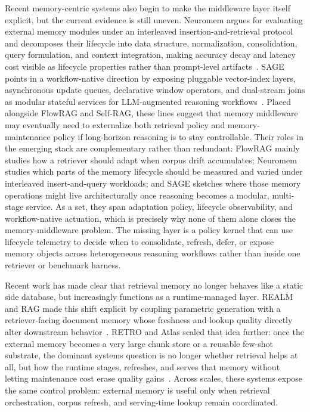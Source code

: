 \documentclass[acmsmall,screen,review]{acmart}
\begin{document}
Recent memory-centric systems also begin to make the middleware layer itself explicit, but the current evidence is still uneven. Neuromem argues for evaluating external memory modules under an interleaved insertion-and-retrieval protocol and decomposes their lifecycle into data structure, normalization, consolidation, query formulation, and context integration, making accuracy decay and latency cost visible as lifecycle properties rather than prompt-level artifacts~\cite{zhang2026neuromem}. SAGE points in a workflow-native direction by exposing pluggable vector-index layers, asynchronous update queues, declarative window operators, and dual-stream joins as modular stateful services for LLM-augmented reasoning workflows~\cite{liu2026sage}. Placed alongside FlowRAG and Self-RAG, these lines suggest that memory middleware may eventually need to externalize both retrieval policy and memory-maintenance policy if long-horizon reasoning is to stay controllable. Their roles in the emerging stack are complementary rather than redundant: FlowRAG mainly studies how a retriever should adapt when corpus drift accumulates; Neuromem studies which parts of the memory lifecycle should be measured and varied under interleaved insert-and-query workloads; and SAGE sketches where those memory operations might live architecturally once reasoning becomes a modular, multi-stage service. As a set, they span adaptation policy, lifecycle observability, and workflow-native actuation, which is precisely why none of them alone closes the memory-middleware problem. The missing layer is a policy kernel that can use lifecycle telemetry to decide when to consolidate, refresh, defer, or expose memory objects across heterogeneous reasoning workflows rather than inside one retriever or benchmark harness.

Recent work has made clear that retrieval memory no longer behaves like a static side database, but increasingly functions as a runtime-managed layer. REALM and RAG made this shift explicit by coupling parametric generation with a retriever-facing document memory whose freshness and lookup quality directly alter downstream behavior~\cite{guu2020realm,lewis2020rag}. RETRO and Atlas scaled that idea further: once the external memory becomes a very large chunk store or a reusable few-shot substrate, the dominant systems question is no longer whether retrieval helps at all, but how the runtime stages, refreshes, and serves that memory without letting maintenance cost erase quality gains~\cite{borgeaud2022retro,izacard2022atlas}. Across scales, these systems expose the same control problem: external memory is useful only when retrieval orchestration, corpus refresh, and serving-time lookup remain coordinated.
\end{document}
